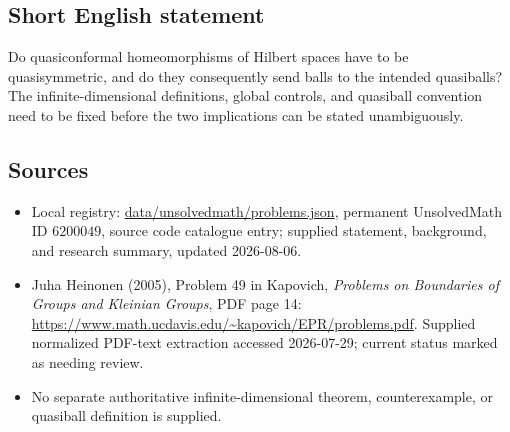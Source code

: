 \documentclass[11pt]{article}
\begin{document}
\subsection{Short English statement}
Do quasiconformal homeomorphisms of Hilbert spaces have to be quasisymmetric, and do they consequently send balls to the intended quasiballs? The infinite-dimensional definitions, global controls, and quasiball convention need to be fixed before the two implications can be stated unambiguously.
\subsection{Sources}
\begin{itemize}
\item Local registry: \url{data/unsolvedmath/problems.json}, permanent UnsolvedMath ID \(6200049\), source code catalogue entry; supplied statement, background, and research summary, updated 2026-08-06.
\item Juha Heinonen (2005), Problem 49 in Kapovich, \emph{Problems on Boundaries of Groups and Kleinian Groups}, PDF page 14: \url{https://www.math.ucdavis.edu/~kapovich/EPR/problems.pdf}. Supplied normalized PDF-text extraction accessed 2026-07-29; current status marked as needing review.
\item No separate authoritative infinite-dimensional theorem, counterexample, or quasiball definition is supplied.
\end{itemize}
\end{document}

